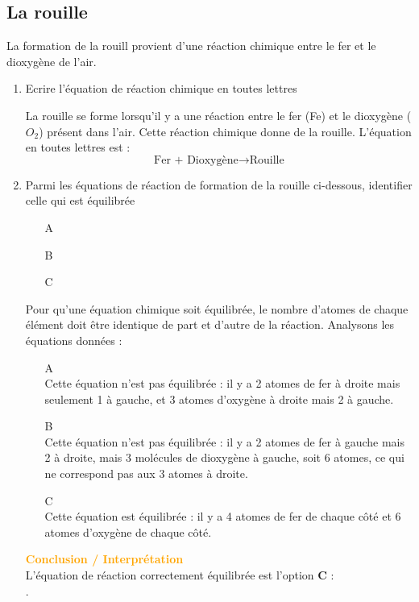 \documentclass[a4paper,12pt]{article}
\begin{document}
\subsection{La rouille}

La formation de la rouill provient d'une réaction chimique entre le fer et le dioxygène de l'air.

\begin{enumerate}

 \item Ecrire l'équation de réaction chimique en toutes lettres
 
 La rouille se forme lorsqu'il y a une réaction entre le fer (Fe) et le dioxygène ($O_2$) présent dans l'air. Cette réaction chimique donne de la rouille. L'équation en toutes lettres est :
 \[
 \text{Fer + Dioxygène} \rightarrow \text{Rouille}
 \]

 \item Parmi les équations de réaction de formation de la rouille ci-dessous, identifier celle qui est équilibrée 
 
 \begin{itemize}[noitemsep]
  \item[A] 
  \item[B] 
  \item[C] 
 \end{itemize}

 Pour qu'une équation chimique soit équilibrée, le nombre d'atomes de chaque élément doit être identique de part et d'autre de la réaction. Analysons les équations données :
    
 \begin{itemize}
     \item[A]  \\
     Cette équation n'est pas équilibrée : il y a 2 atomes de fer à droite mais seulement 1 à gauche, et 3 atomes d'oxygène à droite mais 2 à gauche.
     
     \item[B]  \\
     Cette équation n'est pas équilibrée : il y a 2 atomes de fer à gauche mais 2 à droite, mais 3 molécules de dioxygène à gauche, soit 6 atomes, ce qui ne correspond pas aux 3 atomes à droite.
     
     \item[C]  \\
     Cette équation est équilibrée : il y a 4 atomes de fer de chaque côté et 6 atomes d'oxygène de chaque côté.
 \end{itemize}

 \textcolor{orange}{\textbf{Conclusion / Interprétation}} \\
 L'équation de réaction correctement équilibrée est l'option \textbf{C} : \\
.
 

\end{enumerate}
\end{document}
